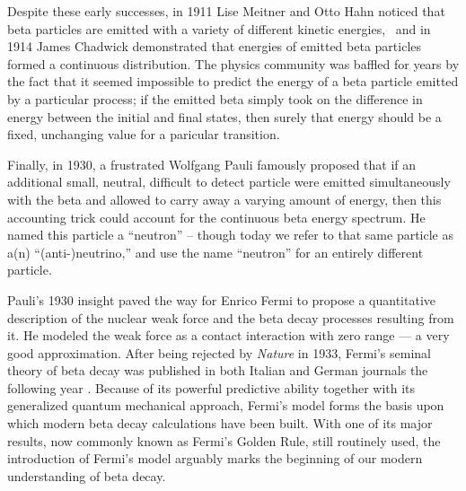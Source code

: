 Despite these early successes, in 1911 Lise Meitner and Otto Hahn noticed that beta particles are emitted with a variety of different kinetic energies,~ and in 1914 James Chadwick
demonstrated that energies of emitted beta particles formed a continuous distribution.  The physics community was baffled for years by the fact that it seemed impossible to predict the energy of a beta particle emitted by a particular process;  if the emitted beta simply took on the difference in energy between the initial and final states, then surely that energy should be a fixed, unchanging value for a paricular transition. 

Finally, in 1930, a frustrated Wolfgang Pauli famously proposed that if an additional small, neutral, difficult to detect particle were emitted simultaneously with the beta and allowed to carry away a varying amount of energy, then this accounting trick could account for the continuous beta energy spectrum.
He named this particle a ``neutron'' -- though today we refer to that same particle as a(n) ``(anti-)neutrino,'' and use the name ``neutron'' for an entirely different particle\cite{PauliNeutrino1978}.  

Pauli's 1930 insight paved the way for Enrico Fermi to propose a quantitative description of the nuclear weak force and the beta decay processes resulting from it.  He modeled the weak force as a contact interaction with zero range --- a very good approximation.  After being rejected by \emph{Nature} in 1933, Fermi's seminal theory of beta decay was published in both Italian and German journals the following year \cite{AbrahamPais} \cite{Fermi1934Italian} \cite{Fermi1934German}.
Because of its powerful predictive ability together with its generalized quantum mechanical approach, Fermi's model forms the basis upon which modern beta decay calculations have been built.  With one of its major results, now commonly known as Fermi's Golden Rule, still routinely used, the introduction of Fermi's model arguably marks the beginning of our modern understanding of beta decay.

